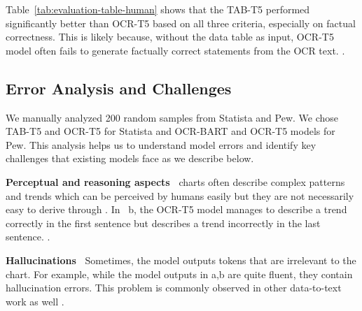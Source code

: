 Table~\ref{tab:evaluation-table-human} shows that the TAB-T5 performed significantly better than OCR-T5 based on all three criteria, especially on factual correctness. This is likely because, without the data table as input, OCR-T5 model often fails to generate factually correct statements from the OCR text. . 










\subsection{Error Analysis and Challenges}
\label{sec:error-analysis}



We manually analyzed 200 random samples from Statista and Pew. We chose TAB-T5 and OCR-T5 for Statista and OCR-BART and OCR-T5 models for Pew. This analysis helps us to understand model errors and identify key challenges that existing models face as we describe below.

\vspace{0.5em}
\noindent \textbf{Perceptual and reasoning aspects~}  charts often describe complex patterns and trends which can be perceived by humans easily but they are not necessarily easy to derive through . 
In ~b, the OCR-T5 model manages to describe a trend correctly in the first sentence but describes a trend incorrectly in the last sentence.  .




\vspace{0.5em}
\noindent \textbf{Hallucinations~} Sometimes, the model outputs tokens that are irrelevant to the chart.
For example, while the model outputs 
in a,b are quite fluent, they contain hallucination errors. This problem is commonly observed in other  data-to-text work as well \cite{wiseman2017challenges,parikh2020totto}. 



